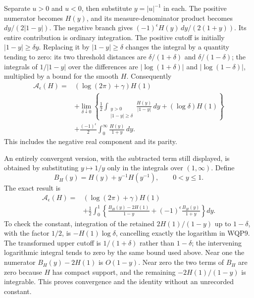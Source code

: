 Separate $u>0$ and $u<0$, then substitute $y=|u|^{-1}$ in each.
The positive numerator becomes $H(y)$, and its measure-denominator
product becomes $dy/(2|1-y|)$. The negative branch gives
$(-1)^\epsilon H(y)\,dy/(2(1+y))$. Its entire contribution is
ordinary integration. The positive cutoff is initially
$|1-y|\ge\delta y$. Replacing it by $|1-y|\ge\delta$ changes
the integral by a quantity tending to zero: its two threshold
distances are $\delta/(1+\delta)$ and $\delta/(1-\delta)$;
the integrals of $1/|1-y|$ over the differences are
$|\log(1+\delta)|$ and $|\log(1-\delta)|$, multiplied by a
bound for the smooth $H$. Consequently
\begin{equation}\tag{WQP9}
 \begin{split}
 \mathcal A_\epsilon(H)={}&
   (\log(2\pi)+\gamma)H(1)\\
 &+\lim_{\delta\downarrow0}
  \left\{\frac12\int_{\substack{y>0\\|1-y|\ge\delta}}
      \frac{H(y)}{|1-y|}\,dy+(\log\delta)H(1)\right\}\\
 &+\frac{(-1)^\epsilon}{2}\int_0^\infty\frac{H(y)}{1+y}\,dy .
 \end{split}
\end{equation}
This includes the negative real component and its parity.

An entirely convergent version, with the subtracted term still displayed,
is obtained by substituting $y\mapsto1/y$ only in the integrals over
$(1,\infty)$. Define
\begin{equation}\tag{WQP10}
 B_H(y)=H(y)+y^{-1}H(y^{-1}),\qquad0<y\le1.
\end{equation}
The exact result is
\begin{equation}\tag{WQP11}
 \begin{split}
 \mathcal A_\epsilon(H)={}&(\log(2\pi)+\gamma)H(1)\\
 &+\frac12\int_0^1
  \left\{\frac{B_H(y)-2H(1)}{1-y}
              +(-1)^\epsilon\frac{B_H(y)}{1+y}\right\}dy .
 \end{split}
\end{equation}
To check the constant, integration of the retained $2H(1)/(1-y)$
up to $1-\delta$, with the factor $1/2$, is
$-H(1)\log\delta$, cancelling exactly the logarithm in WQP9.
The transformed upper cutoff is $1/(1+\delta)$ rather than
$1-\delta$; the intervening logarithmic integral tends to zero
by the same bound used above. Near one the numerator
$B_H(y)-2H(1)$ is $O(1-y)$. Near zero the two terms of $B_H$
are zero because $H$ has compact support, and the remaining
$-2H(1)/(1-y)$ is integrable. This proves convergence and the
identity without an unrecorded constant.

